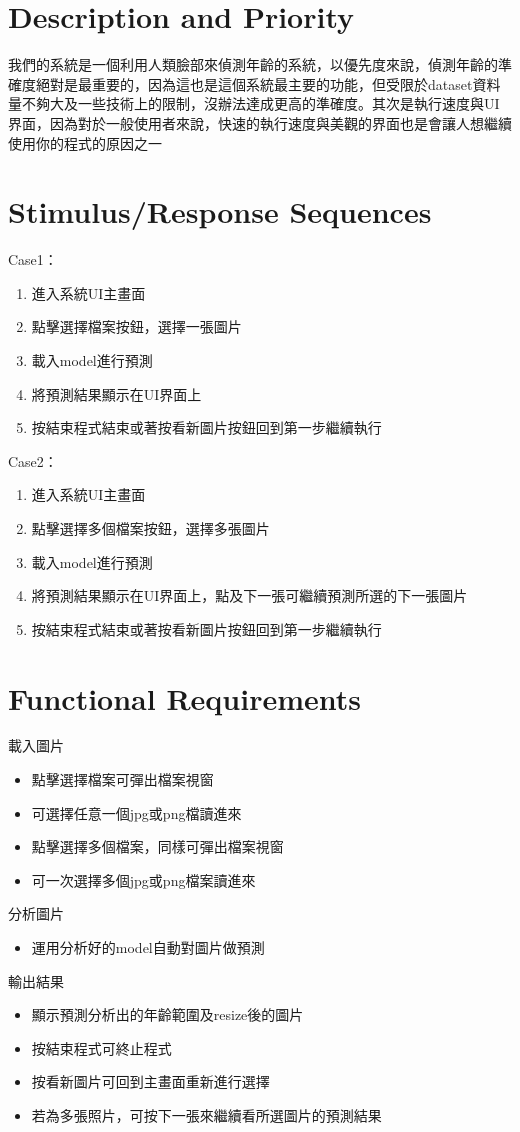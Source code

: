 \documentclass{scrreprt}
\begin{document}
\begin{CJK}{UTF8}{bkai}
\section{Description and Priority}
我們的系統是一個利用人類臉部來偵測年齡的系統，以優先度來說，偵測年齡的準確度絕對是最重要的，因為這也是這個系統最主要的功能，但受限於dataset資料量不夠大及一些技術上的限制，沒辦法達成更高的準確度。其次是執行速度與UI界面，因為對於一般使用者來說，快速的執行速度與美觀的界面也是會讓人想繼續使用你的程式的原因之一

\section{Stimulus/Response Sequences}
Case1：
    \begin{enumerate}
    	\item 進入系統UI主畫面
    	\item 點擊選擇檔案按鈕，選擇一張圖片
    	\item 載入model進行預測
    	\item 將預測結果顯示在UI界面上
	\item 按結束程式結束或著按看新圖片按鈕回到第一步繼續執行
    \end{enumerate}
Case2：
    \begin{enumerate}
    	\item 進入系統UI主畫面
    	\item 點擊選擇多個檔案按鈕，選擇多張圖片
    	\item 載入model進行預測
    	\item 將預測結果顯示在UI界面上，點及下一張可繼續預測所選的下一張圖片
	\item 按結束程式結束或著按看新圖片按鈕回到第一步繼續執行
    \end{enumerate}

\section{Functional Requirements}
載入圖片
    \begin{itemize}
	    \item 點擊選擇檔案可彈出檔案視窗
	    \item 可選擇任意一個jpg或png檔讀進來
	    \item 點擊選擇多個檔案，同樣可彈出檔案視窗
	    \item 可一次選擇多個jpg或png檔案讀進來
    \end{itemize}
分析圖片
    \begin{itemize}
	    \item 運用分析好的model自動對圖片做預測
    \end{itemize}
輸出結果
    \begin{itemize}
	    \item 顯示預測分析出的年齡範圍及resize後的圖片
	    \item 按結束程式可終止程式
	    \item 按看新圖片可回到主畫面重新進行選擇
	    \item 若為多張照片，可按下一張來繼續看所選圖片的預測結果
    \end{itemize}



\end{CJK}
\end{document}
